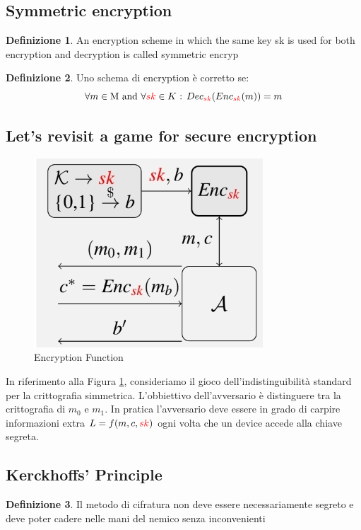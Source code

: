 \documentclass[11pt]{article}
\theoremstyle{definition} \newtheorem{definizione}{Definizione}[section] %
\begin{document}
    \subsection{Symmetric encryption}
    \begin{definizione}
        An encryption scheme in which the same key sk is used for both encryption and decryption
        is called symmetric encryp
    \end{definizione}

    \begin{definizione}
        Uno schema di encryption è corretto se: 
        \begin{equation}
            \forall m \in \text{M and } \forall \textcolor{red}{sk}  \in K \text{ : } Dec_{\textcolor{red}{sk}}(Enc_{\textcolor{red}{sk}}(m)) = m
        \end{equation}
    \end{definizione}

    \subsection{Let's revisit a game for secure encryption}
    \begin{figure}[H]
        \centering
        \includegraphics[width=0.4\linewidth]{1.jpg} 
        \caption{Encryption Function}\label{fig:Figura1}
    \end{figure}
    In riferimento alla Figura \ref{fig:Figura1}, consideriamo il gioco dell'indistinguibilità standard per la crittografia simmetrica.
    L'obbiettivo dell'avversario è distinguere tra la crittografia di $m_0$ e $m_1$.
    In pratica l'avversario deve essere in grado di carpire informazioni extra $L = f(m,c,\textcolor{red}{sk})$ ogni volta che un device accede alla chiave segreta.

    \subsection{Kerckhoffs' Principle}
    \begin{definizione}
        Il metodo di cifratura non deve essere necessariamente segreto e deve poter cadere nelle mani del nemico senza inconvenienti
    \end{definizione}
\end{document}

